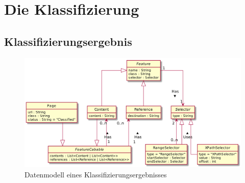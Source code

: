 \section{Die Klassifizierung}
    \subsection{Klassifizierungsergebnis}
        \begin{figure}[htb]
            \centering
            \includegraphics[width=\textwidth]{../resources/concept/page.png}
            \caption{Datenmodell eines Klassifizierungsergebnisses}
            \label{image:conceptPageDataModel}
        \end{figure}